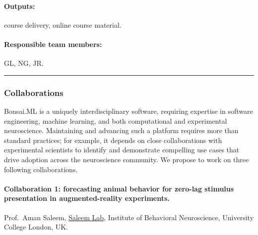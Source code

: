 \paragraph{Outputs:} course delivery, online course material.

\paragraph{Responsible team members:} GL, NG, JR.

\noindent\rule{\textwidth}{1pt}
\subsubsection*{Collaborations}

Bonsai.ML is a uniquely interdisciplinary software, requiring expertise in
software engineering, machine learning, and both computational and experimental
neuroscience. Maintaining and advancing such a platform requires more than
standard practices; for example, it depends on close collaborations with
experimental scientists to identify and demonstrate compelling use cases that
drive adoption across the neuroscience community. We propose to work on three
following collaborations.

\paragraph{Collaboration 1: forecasting animal behavior for zero-lag stimulus
presentation in augmented-reality experiments.} Prof.~Aman Saleem,
\href{https://www.saleemlab.com/}{Saleem Lab}, Institute of Behavioral
Neuroscience, University College London, UK.


